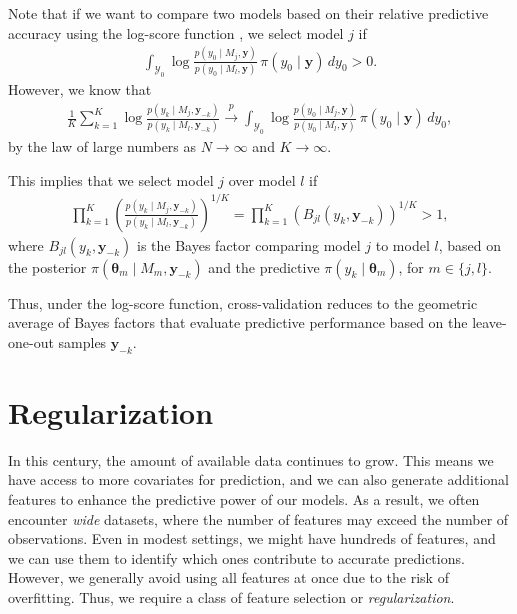 Note that if we want to compare two models based on their relative predictive accuracy using the log-score function \cite{martin2022optimal}, we select model \( j \) if
\begin{align*}
	\int_{\mathcal{Y}_0} \log\frac{p(y_0 \mid M_j, \mathbf{y})}{p(y_0 \mid M_l, \mathbf{y})} \, \pi(y_0 \mid \mathbf{y}) \, dy_0 > 0.
\end{align*}
However, we know that
\begin{align*}
	\frac{1}{K}\sum_{k=1}^K\log\frac{p(y_k \mid M_j, \mathbf{y}_{-k})}{p(y_k \mid M_l, \mathbf{y}_{-k})} 
	\stackrel{p}{\rightarrow} \int_{\mathcal{Y}_0} \log\frac{p(y_0 \mid M_j, \mathbf{y})}{p(y_0 \mid M_l, \mathbf{y})} \, \pi(y_0 \mid \mathbf{y}) \, dy_0,
\end{align*}
by the law of large numbers as \( N \to \infty \) and \( K \to \infty \).

This implies that we select model \( j \) over model \( l \) if
\begin{align*}
	\prod_{k=1}^K \left( \frac{p(y_k \mid M_j, \mathbf{y}_{-k})}{p(y_k \mid M_l, \mathbf{y}_{-k})} \right)^{1/K} 
	= \prod_{k=1}^K \left( B_{jl}(y_k, \mathbf{y}_{-k}) \right)^{1/K} > 1,
\end{align*}
where \( B_{jl}(y_k, \mathbf{y}_{-k}) \) is the Bayes factor comparing model \( j \) to model \( l \), based on the posterior \( \pi(\boldsymbol{\theta}_m \mid M_m, \mathbf{y}_{-k}) \) and the predictive \( \pi(y_k \mid \boldsymbol{\theta}_m) \), for \( m \in \{j, l\} \).

Thus, under the log-score function, cross-validation reduces to the geometric average of Bayes factors that evaluate predictive performance based on the leave-one-out samples \( \mathbf{y}_{-k} \).

\section{Regularization}\label{sec13_2}

In this century, the amount of available data continues to grow. This means we have access to more covariates for prediction, and we can also generate additional features to enhance the predictive power of our models. As a result, we often encounter \textit{wide} datasets, where the number of features may exceed the number of observations. Even in modest settings, we might have hundreds of features, and we can use them to identify which ones contribute to accurate predictions. However, we generally avoid using all features at once due to the risk of overfitting. Thus, we require a class of feature selection or \textit{regularization}.

